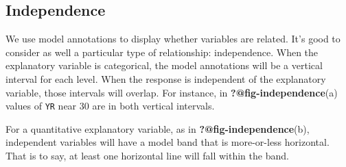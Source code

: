 \documentclass[
  letterpaper,
  DIV=11,
  numbers=noendperiod,
  oneside]{scrartcl}
\begin{document}
\subsection{Independence}\label{independence}

We use model annotations to display whether variables are related. It's
good to consider as well a particular type of relationship:
independence. When the explanatory variable is categorical, the model
annotations will be a vertical interval for each level. When the
response is independent of the explanatory variable, those intervals
will overlap. For instance, in \textbf{?@fig-independence}(a) values of
\texttt{YR} near 30 are in both vertical intervals.

For a quantitative explanatory variable, as in
\textbf{?@fig-independence}(b), independent variables will have a model
band that is more-or-less horizontal. That is to say, at least one
horizontal line will fall within the band.
\end{document}
